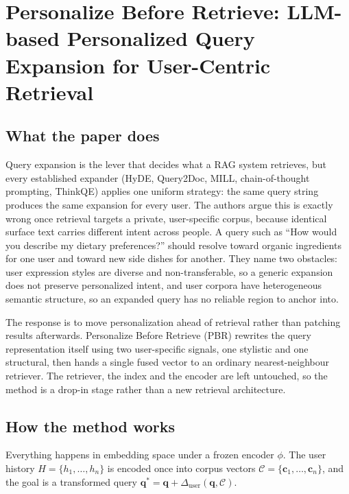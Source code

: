\section{Personalize Before Retrieve: LLM-based Personalized Query Expansion for User-Centric Retrieval}

\subsection{What the paper does}

Query expansion is the lever that decides what a RAG system retrieves, but every established expander (HyDE, Query2Doc, MILL, chain-of-thought prompting, ThinkQE) applies one uniform strategy: the same query string produces the same expansion for every user. The authors argue this is exactly wrong once retrieval targets a private, user-specific corpus, because identical surface text carries different intent across people. A query such as ``How would you describe my dietary preferences?'' should resolve toward organic ingredients for one user and toward new side dishes for another. They name two obstacles: user expression styles are diverse and non-transferable, so a generic expansion does not preserve personalized intent, and user corpora have heterogeneous semantic structure, so an expanded query has no reliable region to anchor into.

The response is to move personalization ahead of retrieval rather than patching results afterwards. Personalize Before Retrieve (PBR) rewrites the query representation itself using two user-specific signals, one stylistic and one structural, then hands a single fused vector to an ordinary nearest-neighbour retriever. The retriever, the index and the encoder are left untouched, so the method is a drop-in stage rather than a new retrieval architecture.

\subsection{How the method works}

Everything happens in embedding space under a frozen encoder $\phi$. The user history $H=\{h_1,\dots,h_n\}$ is encoded once into corpus vectors $\mathcal{C}=\{\mathbf{c}_1,\dots,\mathbf{c}_n\}$, and the goal is a transformed query $\mathbf{q}^{*}=\mathbf{q}+\Delta_{\mathrm{user}}(\mathbf{q},\mathcal{C})$.

